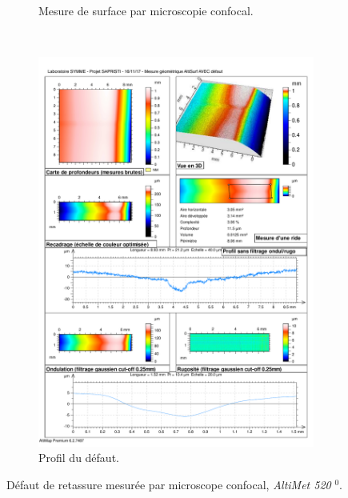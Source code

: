 \begin{figure}[btp]
\begin{subfigure}[c]{0.48\textwidth}
		\caption{Mesure de surface par microscopie confocal.}
	\end{subfigure} \\
	\vspace{2\baselineskip}
	\begin{subfigure}[c]{\textwidth}
		\centering
		\includegraphics[width=\textwidth]{../Chap2/Figures/altisurf_defect_profil.pdf}
		\caption{Profil du défaut.}
	\end{subfigure}%
	\caption{Défaut de retassure mesurée par microscope confocal, \textit{AltiMet 520} $^0$.}
	\label{fig:confocal_defect}
\end{figure}
{}

